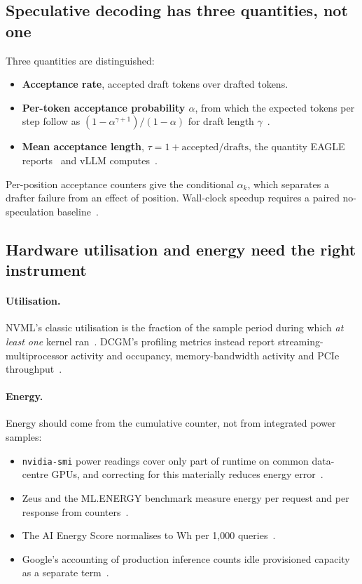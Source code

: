 \documentclass[11pt]{article}
\begin{document}
\subsection{Speculative decoding has three quantities, not one}

Three quantities are distinguished:
\begin{itemize}
\item \textbf{Acceptance rate}, accepted draft tokens over drafted tokens.
\item \textbf{Per-token acceptance probability $\alpha$}, from which the expected tokens per step
follow as $(1-\alpha^{\gamma+1})/(1-\alpha)$ for draft length $\gamma$~\citep{leviathan2023spec}.
\item \textbf{Mean acceptance length}, $\tau = 1 + \text{accepted}/\text{drafts}$, the quantity
EAGLE reports~\citep{li2024eagle} and vLLM computes~\citep{vllm_metrics}.
\end{itemize}
Per-position acceptance counters give the conditional $\alpha_k$, which separates a drafter failure
from an effect of position. Wall-clock speedup requires a paired no-speculation
baseline~\citep{leviathan2023spec,chen2023specsampling,cai2024medusa}.

\subsection{Hardware utilisation and energy need the right instrument}

\paragraph{Utilisation.} NVML's classic utilisation is the fraction of the sample period during which
\emph{at least one} kernel ran~\citep{nvml_api}. DCGM's profiling metrics instead report
streaming-multiprocessor activity and occupancy, memory-bandwidth activity and PCIe
throughput~\citep{dcgm_features}.

\paragraph{Energy.} Energy should come from the cumulative counter, not from integrated power
samples:
\begin{itemize}
\item \texttt{nvidia-smi} power readings cover only part of runtime on common data-centre GPUs, and
correcting for this materially reduces energy error~\citep{yang2023parttime}.
\item Zeus and the ML.ENERGY benchmark measure energy per request and per response from
counters~\citep{zeus_measure,chung2023bestpractices,chung2025mlenergy}.
\item The AI Energy Score normalises to Wh per 1,000 queries~\citep{aienergyscore}.
\item Google's accounting of production inference counts idle provisioned capacity as a separate
term~\citep{elsworth2025google}.
\end{itemize}
\end{document}
